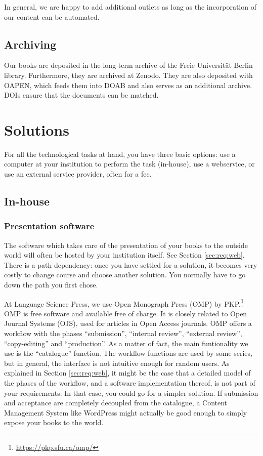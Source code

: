 \documentclass[nonflat,modfonts,output=book] {langsci/langscibook}
\newcommand{\footurl}[1]{\footnote{\url{#1}}}
\begin{document}
In general, we are happy to add additional outlets as long as the incorporation of our content can be automated.  
 
   


\subsection{Archiving}
Our books are deposited in the long-term archive of the Freie Universität Berlin library. Furthermore, they are archived at Zenodo. They are also deposited with OAPEN, which feeds them into DOAB and also serves as an additional archive. DOIs ensure that the documents can be matched.

\section{Solutions}\label{sec:solutions}
For all the technological tasks at hand, you have three basic options: use a computer at your institution to perform the task (in-house), use a webservice, or use an external service provider, often for a fee. 

\subsection{In-house}
\subsubsection{Presentation software}
The software which takes care of the presentation of your books to the outside world will often be hosted by your institution itself. See Section \ref{sec:req:web}. There is a path dependency: once you have settled for a solution, it becomes very costly to change course and choose another solution. You normally have to go down the path you first chose. 

At Language Science Press, we use Open Monograph Press (OMP) by PKP.\footurl{https://pkp.sfu.ca/omp/} OMP is free software and available free of charge. It is closely related to Open Journal Systems (OJS), used for articles in Open Access journals. OMP offers a workflow with the phases ``submission'', ``internal review'', ``external review'', ``copy-editing'' and ``production''. As a matter of fact, the main funtionality we use is the ``catalogue'' function. The workflow functions are used by some series, but in general, the interface is not intuitive enough for random users. As explained in Section \ref{sec:req:web}, it might be the case that a detailed model of the phases of the workflow, and a software implementation thereof, is not part of your requirements. In that case, you could go for a simpler solution. If submission and acceptance are completely decoupled from the catalogue, a Content Management System like WordPress might actually be good enough to simply expose your books to the world. 
\end{document}
